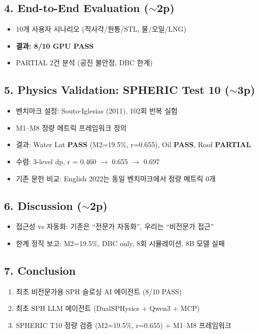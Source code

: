 \documentclass[11pt,a4paper]{article}
\begin{document}
\subsection{4. End-to-End Evaluation ({\small\color{gray}$\sim$2p})}
\begin{itemize}[nosep,leftmargin=1.5em]
\item 10개 사용자 시나리오 (직사각/원통/STL, 물/오일/LNG)
\item \textbf{결과: 8/10 GPU PASS}
\item PARTIAL 2건 분석 (공진 불안정, DBC 한계)
\end{itemize}

\subsection{5. Physics Validation: SPHERIC Test 10 ({\small\color{gray}$\sim$3p})}
\begin{itemize}[nosep,leftmargin=1.5em]
\item 벤치마크 설정: Souto-Iglesias (2011), 102회 반복 실험
\item M1--M8 정량 메트릭 프레임워크 정의
\item 결과: Water Lat \textbf{PASS} (M2=19.5\%, r=0.655), Oil \textbf{PASS}, Roof \textbf{PARTIAL}
\item 수렴: 3-level dp, r = 0.460 $\rightarrow$ 0.655 $\rightarrow$ 0.697
\item 기존 문헌 비교: English 2022는 동일 벤치마크에서 정량 메트릭 0개
\end{itemize}

\subsection{6. Discussion ({\small\color{gray}$\sim$2p})}
\begin{itemize}[nosep,leftmargin=1.5em]
\item 접근성 vs 자동화: 기존은 ``전문가 자동화'', 우리는 ``비전문가 접근''
\item 한계 정직 보고: M2=19.5\%, DBC only, 8회 시뮬레이션, 8B 모델 실패
\end{itemize}

\subsection{7. Conclusion}
\begin{enumerate}[nosep,leftmargin=1.5em]
\item 최초 비전문가용 SPH 슬로싱 AI 에이전트 (8/10 PASS)
\item 최초 SPH LLM 에이전트 (DualSPHysics + Qwen3 + MCP)
\item SPHERIC T10 정량 검증 (M2=19.5\%, r=0.655) + M1--M8 프레임워크
\end{enumerate}
\end{document}
